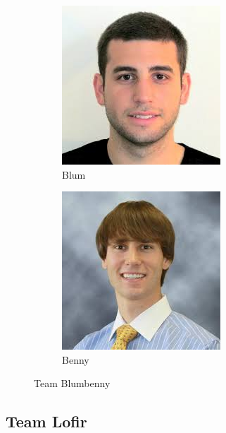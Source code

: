\documentclass[11pt, oneside]{article} %
\numberwithin{equation}{section} %
\numberwithin{figure}{section} %
\numberwithin{table}{section} %
\begin{document}
	\begin{figure}
		\centering
		\begin{subfigure}{.4\textwidth}
			\centering
			\includegraphics[width=.4\textwidth]{resources/blum.jpg}
			\caption{Blum}
		\end{subfigure}
		\begin{subfigure}{.4\textwidth}
			\centering
			\includegraphics[width=.4\textwidth]{resources/benny.jpg}
			\caption{Benny}
		\end{subfigure}
		\caption{Team Blumbenny}
	\end{figure}


	\subsection{Team Lofir}
	
\end{document}

